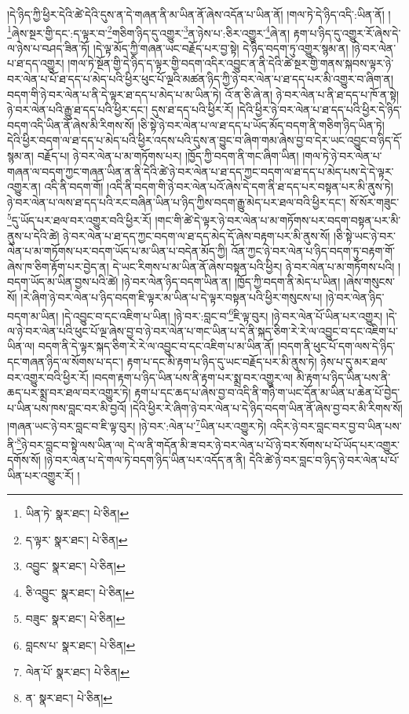།དེ་ཉིད་ཀྱི་ཕྱིར་དེའི་ཚེ་དེའི་དུས་ན་དེ་གཞན་ནི་མ་ཡིན་ནོ་ཞེས་འདོན་པ་ཡིན་ནོ། །གལ་ཏེ་དེ་ཉིད་འདི་:ཡིན་ནོ། །\footnote{ཡིན་ཏེ་  སྣར་ཐང་།  པེ་ཅིན། }ཞེས་སྔར་གྱི་དང་:ད་ལྟར་བ་\footnote{ད་ལྟར་  སྣར་ཐང་།  པེ་ཅིན། }གཅིག་ཉིད་དུ་འགྱུར་\footnote{འབྱུང་  སྣར་ཐང་།  པེ་ཅིན། }ན་ཉེས་པ་:ཅིར་འགྱུར་\footnote{ཅི་འབྱུང་  སྣར་ཐང་།  པེ་ཅིན། }ཞེ་ན། རྟག་པ་ཉིད་དུ་འགྱུར་རོ་ཞེས་དེ་ལ་ཉེས་པ་བཤད་ཟིན་ཏོ། །དེ་ལྟ་མོད་ཀྱི་གཞན་ཡང་བརྗོད་པར་བྱ་སྟེ། དེ་ཉིད་བདག་ཏུ་འགྱུར་སྙམ་ན། །ཉེ་བར་ལེན་པ་ཐ་དད་འགྱུར། །གལ་ཏེ་སྔོན་གྱི་དེ་ཉིད་ད་ལྟར་གྱི་བདག་འདིར་འབྱུང་ན་ནི་དེའི་ཚེ་སྔར་གྱི་གནས་སྐབས་ལྟར་ཉེ་བར་ལེན་པ་པོ་ཐ་དད་པ་མེད་པའི་ཕྱིར་ཕུང་པོ་ལྔའི་མཚན་ཉིད་ཀྱི་ཉེ་བར་ལེན་པ་ཐ་དད་པར་མི་འགྱུར་བ་ཞིག་ན། བདག་གི་ཉེ་བར་ལེན་པ་ནི་དེ་ལྟར་ཐ་དད་པ་མེད་པ་མ་ཡིན་ཏེ། འོ་ན་ཅི་ཞེ་ན། ཉེ་བར་ལེན་པ་ནི་ཐ་དད་པ་ཁོ་ན་སྟེ། ཉེ་བར་ལེན་པའི་རྒྱུ་ཐ་དད་པའི་ཕྱིར་དང་། དུས་ཐ་དད་པའི་ཕྱིར་རོ། །དེའི་ཕྱིར་ཉེ་བར་ལེན་པ་ཐ་དད་པའི་ཕྱིར་དེ་ཉིད་བདག་འདི་ཡིན་ནོ་ཞེས་མི་རིགས་སོ། །ཅི་སྟེ་ཉེ་བར་ལེན་པ་ལ་ཐ་དད་པ་ཡོད་མོད་བདག་ནི་གཅིག་ཉིད་ཡིན་ཏེ། དེའི་ཕྱིར་བདག་ལ་ཐ་དད་པ་མེད་པའི་ཕྱིར་འདས་པའི་དུས་ན་བྱུང་བ་ཞིག་གམ་ཞེས་བྱ་བ་དེར་ཡང་འབྱུང་བ་ཉིད་དོ་སྙམ་ན། བརྗོད་པ། ཉེ་བར་ལེན་པ་མ་གཏོགས་པར། །ཁྱོད་ཀྱི་བདག་ནི་གང་ཞིག་ཡིན། །གལ་ཏེ་ཉེ་བར་ལེན་པ་གཞན་ལ་བདག་ཀྱང་གཞན་ཡིན་ན་ནི་དེའི་ཚེ་ཉེ་བར་ལེན་པ་ཐ་དད་ཀྱང་བདག་ལ་ཐ་དད་པ་མེད་པས་དེ་དེ་ལྟར་འགྱུར་ན། འདི་ནི་བདག་གོ། །འདི་ནི་བདག་གི་ཉེ་བར་ལེན་པའོ་ཞེས་དེ་དག་ནི་ཐ་དད་པར་བསྟན་པར་མི་ནུས་ཏེ། ཉེ་བར་ལེན་པ་ལས་ཐ་དད་པའི་རང་བཞིན་ཡིན་པ་ཉིད་ཀྱིས་བདག་རྒྱུ་མེད་པར་ཐལ་བའི་ཕྱིར་དང་། སོ་སོར་གཟུང་\footnote{བཟུང་  སྣར་ཐང་།  པེ་ཅིན། }དུ་ཡོད་པར་ཐལ་བར་འགྱུར་བའི་ཕྱིར་རོ། །གང་གི་ཚེ་དེ་ལྟར་ཉེ་བར་ལེན་པ་མ་གཏོགས་པར་བདག་བསྟན་པར་མི་ནུས་པ་དེའི་ཚེ། ཉེ་བར་ལེན་པ་ཐ་དད་ཀྱང་བདག་ལ་ཐ་དད་མེད་དོ་ཞེས་བརྟག་པར་མི་ནུས་སོ། །ཅི་སྟེ་ཡང་ཉེ་བར་ལེན་པ་མ་གཏོགས་པར་བདག་ཡོད་པ་མ་ཡིན་པ་བདེན་མོད་ཀྱི། འོན་ཀྱང་ཉེ་བར་ལེན་པ་ཉིད་བདག་ཏུ་བརྟག་གོ་ཞེས་ཁ་ཅིག་རྟོག་པར་བྱེད་ན། དེ་ཡང་རིགས་པ་མ་ཡིན་ནོ་ཞེས་བསྟན་པའི་ཕྱིར། ཉེ་བར་ལེན་པ་མ་གཏོགས་པའི། །བདག་ཡོད་མ་ཡིན་བྱས་པའི་ཚེ། །ཉེ་བར་ལེན་ཉིད་བདག་ཡིན་ན། །ཁྱོད་ཀྱི་བདག་ནི་མེད་པ་ཡིན། །ཞེས་གསུངས་སོ། །རེ་ཞིག་ཉེ་བར་ལེན་པ་ཉིད་བདག་ཇི་ལྟར་མ་ཡིན་པ་དེ་ལྟར་བསྟན་པའི་ཕྱིར་གསུངས་པ། །ཉེ་བར་ལེན་ཉིད་བདག་མ་ཡིན། །དེ་འབྱུང་བ་དང་འཇིག་པ་ཡིན། །ཉེ་བར་:བླང་བ་\footnote{བླངས་པ་  སྣར་ཐང་།  པེ་ཅིན། }ཇི་ལྟ་བུར། །ཉེ་བར་ལེན་པོ་ཡིན་པར་འགྱུར། །དེ་ལ་ཉེ་བར་ལེན་པའི་ཕུང་པོ་ལྔ་ཞེས་བྱ་བ་ཉེ་བར་ལེན་པ་གང་ཡིན་པ་དེ་ནི་སྐད་ཅིག་རེ་རེ་ལ་འབྱུང་བ་དང་འཇིག་པ་ཡིན་ལ། བདག་ནི་དེ་ལྟར་སྐད་ཅིག་རེ་རེ་ལ་འབྱུང་བ་དང་འཇིག་པ་མ་ཡིན་ནོ། །བདག་ནི་ཕུང་པོ་དག་ལས་དེ་ཉིད་དང་གཞན་ཉིད་ལ་སོགས་པ་དང་། རྟག་པ་དང་མི་རྟག་པ་ཉིད་དུ་ཡང་བརྗོད་པར་མི་ནུས་ཏེ། ཉེས་པ་དུ་མར་ཐལ་བར་འགྱུར་བའི་ཕྱིར་རོ། །བདག་རྟག་པ་ཉིད་ཡིན་པས་ནི་རྟག་པར་སྨྲ་བར་འགྱུར་ལ། མི་རྟག་པ་ཉིད་ཡིན་པས་ནི་ཆད་པར་སྨྲ་བར་ཐལ་བར་འགྱུར་ཏེ། རྟག་པ་དང་ཆད་པ་ཞེས་བྱ་བ་འདི་ནི་གཉི་ག་ཡང་དོན་མ་ཡིན་པ་ཆེན་པོ་བྱེད་པ་ཡིན་པས་ཁས་བླང་བར་མི་བྱའོ། །དེའི་ཕྱིར་རེ་ཞིག་ཉེ་བར་ལེན་པ་དེ་ཉིད་བདག་ཡིན་ནོ་ཞེས་བྱ་བར་མི་རིགས་སོ། །གཞན་ཡང་ཉེ་བར་བླང་བ་ཇི་ལྟ་བུར། །ཉེ་བར་:ལེན་པ་\footnote{ལེན་པོ་  སྣར་ཐང་།  པེ་ཅིན། }ཡིན་པར་འགྱུར་ཏེ། འདིར་ཉེ་བར་བླང་བར་བྱ་བ་ཡིན་པས་ནི་\footnote{ན་  སྣར་ཐང་།  པེ་ཅིན། }ཉེ་བར་བླང་བ་སྟེ་ལས་ཡིན་ལ། དེ་ལ་ནི་གདོན་མི་ཟ་བར་ཉེ་བར་ལེན་པ་པོ་ཉེ་བར་སོགས་པ་པོ་ཡོད་པར་འགྱུར་དགོས་སོ། །ཉེ་བར་ལེན་པ་དེ་གལ་ཏེ་བདག་ཉིད་ཡིན་པར་འདོད་ན་ནི། དེའི་ཚེ་ཉེ་བར་བླང་བ་ཉིད་ཉེ་བར་ལེན་པ་པོ་ཡིན་པར་འགྱུར་རོ། །
